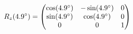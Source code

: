 \documentclass[preview]{standalone}
\begin{document}
\begin{align*}
\special{dvisvgm:raw <g id='unique000'>}R_z(4.9^\circ) = \begin{pmatrix} \cos(4.9^\circ) & -\sin(4.9^\circ) & 0 \\ \sin(4.9^\circ) & \cos(4.9^\circ) & 0 \\ 0 & 0 & 1 \end{pmatrix}\special{dvisvgm:raw </g>}
\end{align*}
\end{document}

